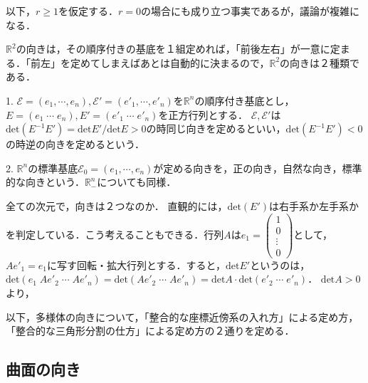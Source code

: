 \documentclass[uplatex, dvipdfmx]{jsreport}
\begin{document}
以下，$r\ge 1$を仮定する．$r=0$の場合にも成り立つ事実であるが，議論が複雑になる．

$\mathbb{R}^2$の向きは，その順序付きの基底を１組定めれば，「前後左右」が一意に定まる．「前左」を定めてしまえばあとは自動的に決まるので，$\mathbb{R}^2$の向きは２種類である．
\begin{definition}
    1. $\mathcal{E}=(e_1,\cdots,e_n), \mathcal{E'}=(e'_1,\cdots,e'_n)$を$\mathbb{R}^n$の順序付き基底とし，$E=(e_1\;\cdots\;e_n), E'=(e'_1\;\cdots\;e'_n)$を正方行列とする．
    $\mathcal{E,E'}$は$\mathrm{det}(E^{-1}E')=\mathrm{det}E'/\mathrm{det}E>0$の時同じ向きを定めるといい，$\mathrm{det}(E^{-1}E')<0$の時逆の向きを定めるという．

    2. $\mathbb{R}^n$の標準基底$\mathcal{E}_0=(e_1,\cdots,e_n)$が定める向きを，正の向き，自然な向き，標準的な向きという．$\mathbb{R}^n_-$についても同様．
\end{definition}
\begin{remark*}
    全ての次元で，向きは２つなのか．
    直観的には，$\mathrm{det}(E')$は右手系か左手系かを判定している．こう考えることもできる．行列$A$は$e_1=\begin{pmatrix}1\\0\\\vdots\\0\end{pmatrix}$として，$Ae'_1=e_1$に写す回転・拡大行列とする．すると，$\mathrm{det}E'$というのは，$\mathrm{det}\left(e_1\;Ae'_2\;\cdots\;Ae'_n\right)=\mathrm{det}\left(Ae'_2\;\cdots\;Ae'_n\right)=\mathrm{det}A\cdot\mathrm{det}\left(e'_2\;\cdots\;e'_n\right)$．
    $\mathrm{det}A>0$より，
\end{remark*}

以下，多様体の向きについて，「整合的な座標近傍系の入れ方」による定め方，「整合的な三角形分割の仕方」による定め方の２通りを定める．

\subsection{曲面の向き}
\end{document}
